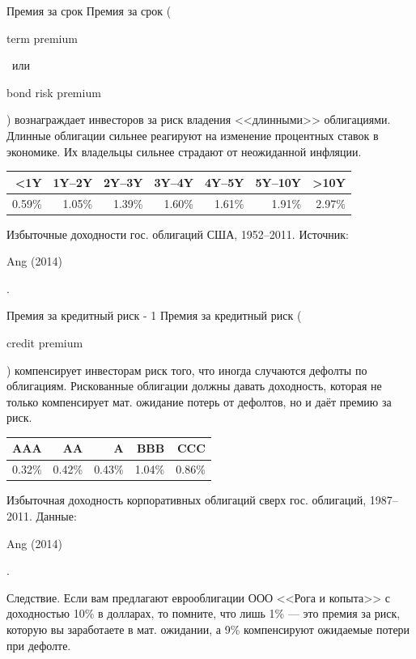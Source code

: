 \documentclass{beamer}
\newcommand{\en}[1]{\begin{otherlanguage}{english}#1\end{otherlanguage}}
\begin{document}
\begin{frame}{Премия за срок}
\justify
Премия за срок (\en{term premium}\ или \en{bond risk premium}) вознаграждает
инвесторов за риск владения <<длинными>> облигациями. Длинные облигации
сильнее реагируют на изменение процентных ставок в экономике. Их владельцы
сильнее страдают от неожиданной инфляции.

\justify
\centering
\begin{tabular}{r|r|r|r|r|r|r}
<1Y    & 1Y--2Y & 2Y--3Y & 3Y--4Y & 4Y--5Y & 5Y--10Y & >10Y \\ \hline
0.59\% & 1.05\% & 1.39\% & 1.60\% & 1.61\% & 1.91\% & 2.97\%
\end{tabular}

\justify
\centering
{\scriptsize Избыточные доходности гос. облигаций США, 1952--2011. Источник:
\en{Ang (2014)}.}
\end{frame}



\begin{frame}{Премия за кредитный риск - 1}
\justify
Премия за кредитный риск (\en{credit premium}) компенсирует инвесторам риск
того, что иногда случаются дефолты по облигациям. Рискованные облигации должны
давать доходность, которая не только компенсирует мат. ожидание потерь от
дефолтов, но и даёт премию за риск.

\justify
\centering
\begin{tabular}{r|r|r|r|r}
AAA    & AA     & A      & BBB    & CCC \\ \hline
0.32\% & 0.42\% & 0.43\% & 1.04\% & 0.86\%  
\end{tabular}

\justify
\centering
{\scriptsize Избыточная доходность корпоративных облигаций сверх гос. 
облигаций, 1987--2011. Данные: \en{Ang (2014)}.}

\justify
Следствие. Если вам предлагают еврооблигации ООО <<Рога и копыта>> с 
доходностью 10\% в долларах, то помните, что лишь 1\% --- это премия за риск,
которую вы заработаете в мат. ожидании, а 9\% компенсируют ожидаемые
потери при дефолте.
\end{frame}
\end{document}
